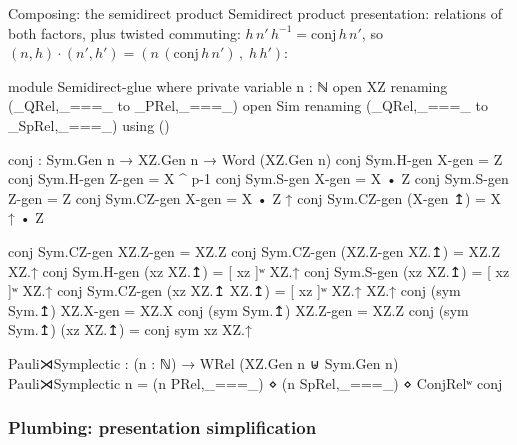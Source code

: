 \documentclass[aspectratio=169]{beamer}
\begin{document}
\begin{frame}{Composing: the semidirect product}
  Semidirect product presentation: relations of both factors, plus
  twisted commuting: $h\,n'\, h^{-1} = \text{conj}\, h\, n'$, so
  $(n , h) \cdot (n' , h') = (n\, (\text{conj}\, h\, n')\, ,\;
  h\,h')$:

\begin{code}[hide]
module Semidirect-glue where
  private variable n : ℕ
  open XZ renaming (_QRel,_===_ to _PRel,_===_)
  open Sim renaming (_QRel,_===_ to _SpRel,_===_) using ()
\end{code}
\begin{code}
  conj : Sym.Gen n → XZ.Gen n → Word (XZ.Gen n)
  conj Sym.H-gen   X-gen         = Z
  conj Sym.H-gen   Z-gen         = X ^ p-1
  conj Sym.S-gen   X-gen         = X • Z
  conj Sym.S-gen   Z-gen         = Z
  conj Sym.CZ-gen  X-gen         = X • Z ↑
  conj Sym.CZ-gen  (X-gen ↥)     = X ↑ • Z
\end{code}
\begin{code}[hide]
  conj Sym.CZ-gen  XZ.Z-gen          = XZ.Z
  conj Sym.CZ-gen  (XZ.Z-gen XZ.↥)   = XZ.Z XZ.↑
  conj Sym.H-gen   (xz XZ.↥)         = [ xz ]ʷ XZ.↑
  conj Sym.S-gen   (xz XZ.↥)         = [ xz ]ʷ XZ.↑
  conj Sym.CZ-gen  (xz XZ.↥ XZ.↥)    = [ xz ]ʷ XZ.↑ XZ.↑
  conj (sym Sym.↥) XZ.X-gen          = XZ.X
  conj (sym Sym.↥) XZ.Z-gen          = XZ.Z
  conj (sym Sym.↥) (xz XZ.↥)         = conj sym xz XZ.↑
\end{code}
\begin{code}
  Pauli⋊Symplectic : (n : ℕ) → WRel (XZ.Gen n ⊎ Sym.Gen n)
  Pauli⋊Symplectic n = (n PRel,_===_) ⋄ (n SpRel,_===_) ⋄ ConjRelʷ conj
\end{code}
\end{frame}

\subsubsection{Plumbing: presentation simplification}
\end{document}
